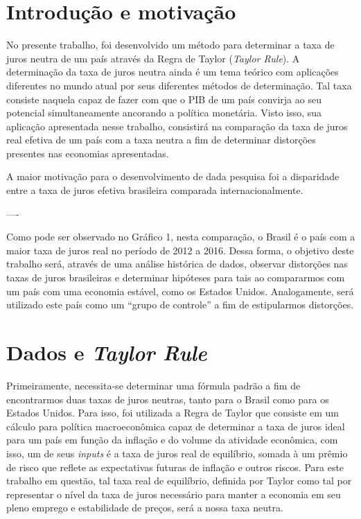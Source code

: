 \section{Introdu\c{c}\~{a}o e motiva\c{c}\~{a}o }




 No presente trabalho, foi desenvolvido um m\'{e}todo para determinar a taxa de juros neutra de um pa\'{i}s atrav\'{e}s da Regra de Taylor (\textit{Taylor Rule}). A determina\c{c}\~{a}o da taxa de juros neutra ainda \'{e} um tema te\'{o}rico com aplica\c{c}\~{o}es diferentes no mundo atual por seus diferentes m\'{e}todos de determina\c{c}\~{a}o. Tal taxa consiste naquela capaz de fazer com que o PIB de um pa\'{i}s convirja ao seu potencial simultaneamente ancorando a pol\'{i}tica monet\'{a}ria. Visto isso, sua aplica\c{c}\~{a}o apresentada nesse trabalho, consistir\'{a} na compara\c{c}\~{a}o da taxa de juros real efetiva de um pa\'{i}s com a taxa neutra a fim de determinar distor\c{c}\~{o}es presentes nas economias apresentadas.

A maior motiva\c{c}\~{a}o para o desenvolvimento de dada pesquisa foi a disparidade entre a taxa de juros efetiva brasileira comparada internacionalmente.

\noindent ----

\noindent 


\noindent 

 Como pode ser observado no Gr\'{a}fico 1, nesta compara\c{c}\~{a}o, o Brasil \'{e} o pa\'{i}s com a maior taxa de juros real no per\'{i}odo de 2012 a 2016. Dessa forma, o objetivo deste trabalho ser\'{a}, atrav\'{e}s de uma an\'{a}lise hist\'{o}rica de dados, observar distor\c{c}\~{o}es nas taxas de juros brasileiras e determinar hip\'{o}teses para tais ao compararmos com um pa\'{i}s com uma economia est\'{a}vel, como os Estados Unidos. Analogamente, ser\'{a} utilizado este pa\'{i}s como um ``grupo de controle'' a fim de estipularmos distor\c{c}\~{o}es. 

\noindent 

\section{Dados e \textit{Taylor Rule} }

\noindent  

 Primeiramente, necessita-se determinar uma f\'{o}rmula padr\~{a}o a fim de encontrarmos duas taxas de juros neutras, tanto para o Brasil como para os Estados Unidos. Para isso, foi utilizada a Regra de Taylor que consiste em um c\'{a}lculo para pol\'{i}tica macroecon\^{o}mica capaz de determinar a taxa de juros ideal para um pa\'{i}s em fun\c{c}\~{a}o da infla\c{c}\~{a}o e do volume da atividade econ\^{o}mica, com isso, um de seus \textit{inputs} \'{e} a taxa de juros real de equil\'{i}brio, somada \`{a} um pr\^{e}mio de risco que reflete as expectativas futuras de infla\c{c}\~{a}o e outros riscos. Para este trabalho em quest\~{a}o, tal taxa real de equil\'{i}brio, definida por Taylor como tal por representar o n\'{i}vel da taxa de juros necess\'{a}rio para manter a economia em seu pleno emprego e estabilidade de pre\c{c}os, ser\'{a} a nossa taxa neutra. 


